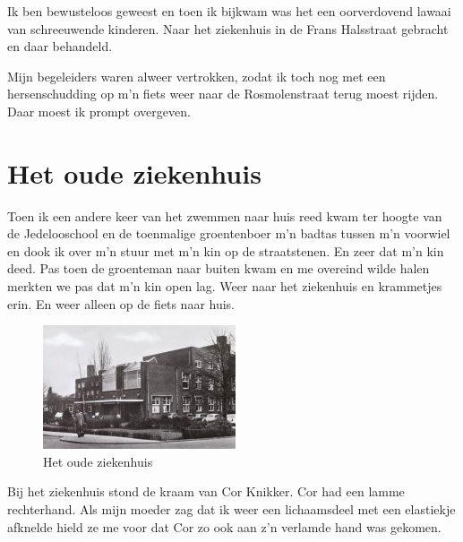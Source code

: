 \documentclass[12pt,twoside, openright]{memoir}
\begin{document}
Ik ben bewusteloos geweest en toen ik bijkwam was het een oorverdovend lawaai van schreeuwende kinderen. Naar het ziekenhuis in de Frans Halsstraat gebracht en daar behandeld.

Mijn begeleiders waren alweer vertrokken, zodat ik toch nog met een hersenschudding op m’n fiets weer naar de Rosmolenstraat terug moest rijden. Daar moest ik prompt overgeven. 

\chapter{Het oude ziekenhuis} %
\label{cha:ziekenhuis}

Toen ik een andere keer van het zwemmen naar huis reed kwam ter hoogte van de Jedelooschool en de toenmalige groentenboer m’n badtas tussen m’n voorwiel en dook ik over m’n stuur met m’n kin op de straatstenen. En zeer dat m’n kin deed. Pas toen de groenteman naar buiten kwam en me overeind wilde halen merkten we pas dat m’n kin open lag. Weer naar het ziekenhuis en krammetjes erin. En weer alleen op de fiets naar huis.

\begin{figure}
\includegraphics[width=\textwidth]{img/ch12/zkhuis2}
\caption*{\footnotesize Het oude ziekenhuis}
\end{figure}

Bij het ziekenhuis stond de kraam van Cor Knikker. Cor had een lamme rechterhand. Als mijn moeder zag dat ik weer een lichaamsdeel met een elastiekje afknelde hield ze me voor dat Cor zo ook aan z’n verlamde hand was gekomen.
\end{document}

